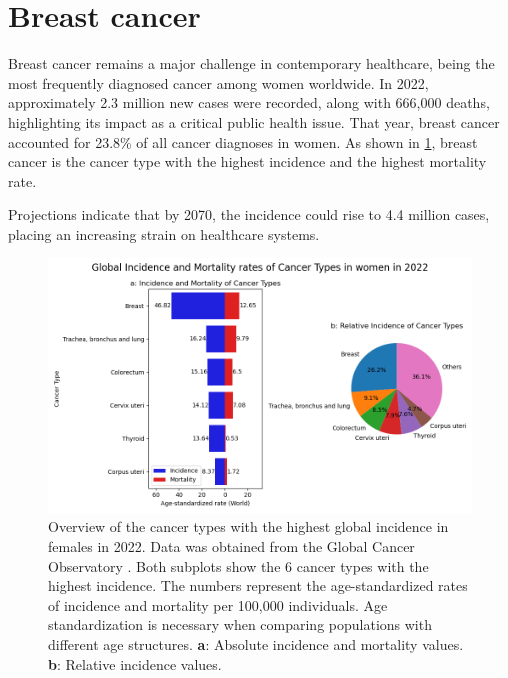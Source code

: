 \section{Breast cancer}

Breast cancer remains a major challenge in contemporary healthcare, being the
most frequently diagnosed cancer among women worldwide.
In 2022, approximately 2.3 million new cases were recorded, along with 666,000
deaths, highlighting its impact as a critical public health issue.
That year, breast cancer accounted for 23.8\% of all cancer diagnoses in
women\supercite{bray_global_2024,ferlay_global_2024}.
As shown in \cref{fig:brca_incidence_mortality}, breast cancer is the cancer
type with the highest incidence and the highest mortality rate.

Projections indicate that by 2070, the incidence could rise to 4.4 million
cases, placing an increasing strain on healthcare
systems\supercite{lei_global_2021}.

\begin{figure}[ht]
    \centering

    \includegraphics[width=\textwidth]{chapters/background/figures/incidence.png}
    \caption{Overview of the cancer types with the highest global incidence in
        females in 2022.
        Data was obtained from the Global Cancer Observatory
        \supercite{bray_global_2024,ferlay_global_2024}.
        Both subplots show the 6 cancer types with the highest incidence.
        The numbers represent the age-standardized rates of incidence and mortality per
        100,000 individuals.
        Age standardization is necessary when comparing populations with different age
        structures\supercite{segi_age-adjusted_1960,doll_cancer_1966}.
        \textbf{a}: Absolute incidence and mortality values.
        \textbf{b}: Relative incidence values.
    }
    \label{fig:brca_incidence_mortality}
\end{figure}

